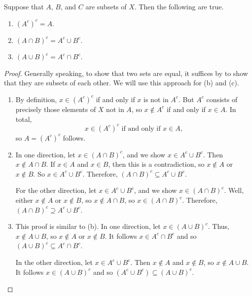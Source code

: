\documentclass[../main.tex]{subfiles}
\begin{document}
\begin{theorem}  \label{thm:de-morgan}
    Suppose that $A$, $B$, and $C$ are subsets of $X$. Then the following are true.
    \begin{enumerate}[label=(\alph*)]
        \item $(A^c)^c = A$.
        \item $(A\cap B)^c = A^c \cup B^c$.
        \item $(A\cup B)^c = A^c \cap B^c$.
    \end{enumerate}
\end{theorem}
\begin{proof}
    Generally speaking, to show that two sets are equal, it suffices by  to show that they are subsets of each other. We will use this approach for (b) and (c).
    \begin{enumerate}[label=(\alph*)]
        \item By definition, $x \in (A^c)^c$ if and only if $x$ is not in $A^c$. But $A^c$ consists of precisely those elements of $X$ not in $A$, so $x \notin A^c$ if and only if $x \in A$. In total,
        \[x\in(A^c)^c\text{ if and only if }x\in A,\]
        so $A=(A^c)^c$ follows.
        
        \item In one direction, let $x \in (A \cap B)^c$, and we show $x\in A^c\cup B^c$. Then $x \notin A \cap B$. If $x \in A$ and $x \in B$, then this is a contradiction, so $x \notin A$ or $x \notin B$. So $x \in A^c \cup B^c$. Therefore, $(A \cap B)^c \subseteq A^c \cup B^c$.
        
        For the other direction, let $x \in A^c \cup B^c$, and we show $x\in(A\cap B)^c$. Well, either $x \notin A$ or $x \notin B$, so $x \notin A \cap B$, so $x \in (A \cap B)^c$. Therefore, $(A \cap B)^c \supseteq A^c \cup B^c$.
        
        \item This proof is similar to (b). In one direction, let $x \in (A \cup B)^c$. Thus, $x\notin A\cup B$, so $x\notin A$ or $x\notin B$. It follows $x\in A^c\cap B^c$ and so $(A\cup B)^c\subseteq A^c\cap B^c$.
        
        In the other direction, let $x\in A^c\cup B^c$. Then $x\notin A$ and $x\notin B$, so $x\notin A\cup B$. It follows $x\in(A\cup B)^c$ and so $(A^c\cup B^c)\subseteq(A\cup B)^c$.
        \qedhere
    \end{enumerate}
\end{proof}
\end{document}
